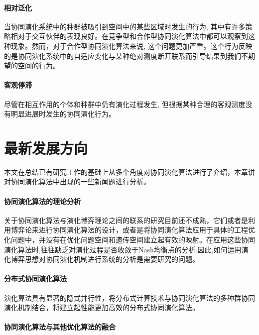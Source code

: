 \documentclass[a4paper]{article}
\begin{document}
    \paragraph{相对泛化}

    当协同演化系统中的种群被吸引到空间中的某些区域时发生的行为, 其中有许多策略相对于交互伙伴的表现良好。在竞争型和合作型协同演化算法中都可以观察到这种现象。然而，对于合作型协同演化算法来说, 这个问题更加严重。这个行为反映的是协同演化系统中的自适应变化与某种绝对测度断开联系而引导结果到我们不期望的空间的行为。

    \paragraph{客观停滞}

    尽管在相互作用的个体和种群中仍有演化过程发生, 但根据某种合理的客观测度没有明显进展时发生的协同演化行为。


    \newpage
    \section{最新发展方向}
    
    本文在总结已有研究工作的基础上从多个角度对协同演化算法进行了介绍，本章讲对协同演化算法中出现的一些新闻题进行分析。

    \paragraph{协同演化算法的理论分析}

    关于协同演化算法与演化博弈理论之间的联系的研究目前还不成熟，它们或者是利用博弈论来进行协同演化算法的设计，或者是将协同演化算法应用于具体的工程优化问题中，并没有在优化问题空间和遗传空间建立起有效的映射。在应用这些协同演化算法时,往往缺乏对演化过程是否收敛于Nash均衡点的分析.因此,如何运用演化博弈思想对协同演化机制进行系统的分析是需要研究的问题。

    \paragraph{分布式协同演化算法}

    演化算法具有显著的隐式并行性，将分布式计算技术与协同演化算法的多种群协同演化机制结合，将建立起性能更加高效的分布式协同演化算法。

    \paragraph{协同演化算法与其他优化算法的融合}
\end{document}
